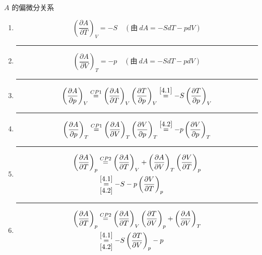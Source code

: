 \begin{example}
    \( A \) 的偏微分关系
    \begin{enumerate}
        \item\label{4.1} \[\left(\frac{\partial A}{\partial T}\right)_V = -S \quad (\text{由} \ dA = -S dT - p dV ) \]
        \hrule
        \item\label{4.2} \[\left(\frac{\partial A}{\partial V}\right)_T = -p \quad (\text{由} \ dA = -S dT - p dV ) \]
        \hrule
        \item\label{4.3} \begin{align*}
            \left(\frac{\partial A}{\partial p}\right)_V 
            \overset{CP1}{=} \left(\frac{\partial A}{\partial T}\right)_V 
            \left(\frac{\partial T}{\partial p}\right)_V 
            \overset{\ref*{4.1}}{=} -S \left(\frac{\partial T}{\partial p}\right)_V
        \end{align*}
        \hrule
        \item\label{4.4} \begin{align*}
            \left(\frac{\partial A}{\partial p}\right)_T 
            \overset{CP1}{=} \left(\frac{\partial A}{\partial V}\right)_T 
            \left(\frac{\partial V}{\partial p}\right)_T 
            \overset{\ref*{4.2}}{=} -p \left(\frac{\partial V}{\partial p}\right)_T
        \end{align*}
        \hrule
        \item\label{4.5} \begin{align*}
            \left(\frac{\partial A}{\partial T}\right)_p 
            &\overset{CP2}{=} \left(\frac{\partial A}{\partial T}\right)_V 
            + \left(\frac{\partial A}{\partial V}\right)_T 
            \left(\frac{\partial V}{\partial T}\right)_p \\
            &\overunderset{\ref*{4.1}}{\ref*{4.2}}{=} -S -p \left(\frac{\partial V}{\partial T}\right)_p
        \end{align*}
        \hrule
        \item\label{4.6} \begin{align*}
            \left(\frac{\partial A}{\partial T}\right)_p 
            &\overset{CP2}{=} \left(\frac{\partial A}{\partial T}\right)_V 
            \left(\frac{\partial T}{\partial V}\right)_p
            + \left(\frac{\partial A}{\partial V}\right)_T  \\
            &\overunderset{\ref*{4.1}}{\ref*{4.2}}{=} 
            -S\left(\frac{\partial T}{\partial V}\right)_p -p 
        \end{align*}
    \end{enumerate}
\end{example}
